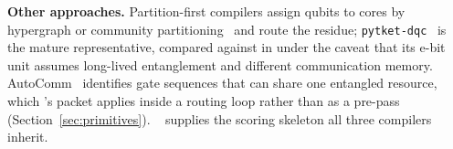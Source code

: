 \textbf{Other approaches.} Partition-first compilers assign qubits to
cores by hypergraph or community
partitioning~\cite{escofet2023hqa,pytketdqc2024,daei2020optimized} and
route the residue; \texttt{pytket-dqc}~\cite{pytketdqc2024} is the
mature representative, compared against in \appPytket{} under the
caveat that its e-bit unit assumes long-lived entanglement and
different communication memory. AutoComm~\cite{wu2022autocomm}
identifies gate sequences that can share one entangled resource, which
\PORTER{}'s packet applies inside a routing loop rather than as a
pre-pass (Section~\ref{sec:primitives}).
\SABRE{}~\cite{li2019tackling} supplies the
scoring skeleton all three compilers inherit.
